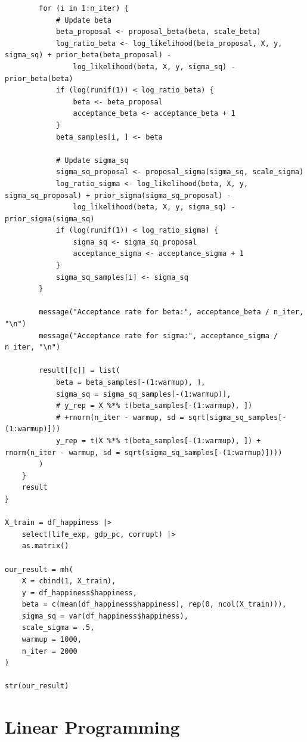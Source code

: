 \documentclass[
  letterpaper,
]{krantz}
\begin{document}
\begin{verbatim}
        for (i in 1:n_iter) {
            # Update beta
            beta_proposal <- proposal_beta(beta, scale_beta)
            log_ratio_beta <- log_likelihood(beta_proposal, X, y, sigma_sq) + prior_beta(beta_proposal) -
                log_likelihood(beta, X, y, sigma_sq) - prior_beta(beta)
            if (log(runif(1)) < log_ratio_beta) {
                beta <- beta_proposal
                acceptance_beta <- acceptance_beta + 1
            }
            beta_samples[i, ] <- beta

            # Update sigma_sq
            sigma_sq_proposal <- proposal_sigma(sigma_sq, scale_sigma)
            log_ratio_sigma <- log_likelihood(beta, X, y, sigma_sq_proposal) + prior_sigma(sigma_sq_proposal) -
                log_likelihood(beta, X, y, sigma_sq) - prior_sigma(sigma_sq)
            if (log(runif(1)) < log_ratio_sigma) {
                sigma_sq <- sigma_sq_proposal
                acceptance_sigma <- acceptance_sigma + 1
            }
            sigma_sq_samples[i] <- sigma_sq
        }
    
        message("Acceptance rate for beta:", acceptance_beta / n_iter, "\n")
        message("Acceptance rate for sigma:", acceptance_sigma / n_iter, "\n")

        result[[c]] = list(
            beta = beta_samples[-(1:warmup), ], 
            sigma_sq = sigma_sq_samples[-(1:warmup)],
            # y_rep = X %*% t(beta_samples[-(1:warmup), ])
            # +rnorm(n_iter - warmup, sd = sqrt(sigma_sq_samples[-(1:warmup)]))
            y_rep = t(X %*% t(beta_samples[-(1:warmup), ]) + rnorm(n_iter - warmup, sd = sqrt(sigma_sq_samples[-(1:warmup)])))
        )
    } 
    result
}

X_train = df_happiness |>
    select(life_exp, gdp_pc, corrupt) |>
    as.matrix()

our_result = mh(
    X = cbind(1, X_train),
    y = df_happiness$happiness, 
    beta = c(mean(df_happiness$happiness), rep(0, ncol(X_train))),
    sigma_sq = var(df_happiness$happiness),
    scale_sigma = .5,
    warmup = 1000,
    n_iter = 2000
)

str(our_result)
\end{verbatim}

\section{Linear Programming}\label{linear-programming}



\printindex
\end{document}
